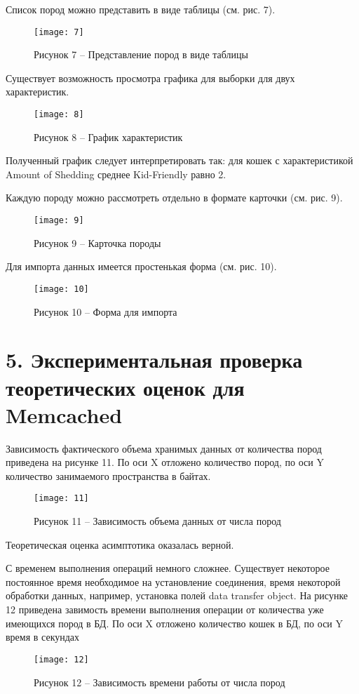 Список пород можно представить в виде таблицы (см. рис. 7).
\begin{figure}[H]
    \centering
    \texttt{[image: 7]}
    \caption*{Рисунок 7 -- Представление пород в виде таблицы}
    \label{fig:7}
\end{figure}

Существует возможность просмотра графика для выборки для двух характеристик.
\begin{figure}[H]
    \centering
    \texttt{[image: 8]}
    \caption*{Рисунок 8 -- График характеристик}
    \label{fig:8}
\end{figure}

Полученный график следует интерпретировать так: для кошек с характеристикой
Amount of Shedding среднее Kid-Friendly равно 2.

Каждую породу можно рассмотреть отдельно в формате карточки (см. рис. 9).
\begin{figure}[H]
    \centering
    \texttt{[image: 9]}
    \caption*{Рисунок 9 -- Карточка породы}
    \label{fig:9}
\end{figure}

Для импорта данных имеется простенькая форма (см. рис. 10).
\begin{figure}[H]
    \centering
    \texttt{[image: 10]}
    \caption*{Рисунок 10 -- Форма для импорта}
    \label{fig:10}
\end{figure}

\pagebreak
{}
\section*{5. Экспериментальная проверка теоретических оценок для Memcached}
Зависимость фактического объема хранимых данных от количества пород приведена на рисунке 11.
По оси X отложено количество пород, по оси Y количество занимаемого пространства в байтах.
\begin{figure}[H]
    \centering
    \texttt{[image: 11]}
    \caption*{Рисунок 11 -- Зависимость объема данных от числа пород}
    \label{fig:11}
\end{figure}

Теоретическая оценка асимптотика оказалась верной.

С временем выполнения операций немного сложнее.
Существует некоторое постоянное время необходимое на установление соединения, время
некоторой обработки данных, например, установка полей data transfer object.
На рисунке 12 приведена завимость времени выполнения операции от количества уже имеющихся
пород в БД.
По оси X отложено количество кошек в БД, по оси Y время в секундах
\begin{figure}[H]
    \centering
    \texttt{[image: 12]}
    \caption*{Рисунок 12 -- Зависимость времени работы от числа пород}
    \label{fig:12}
\end{figure}

